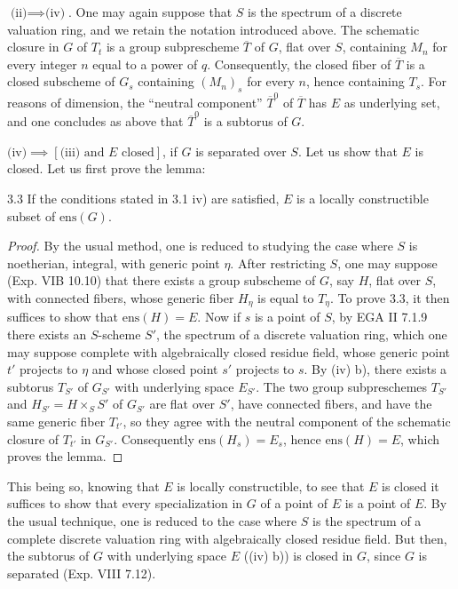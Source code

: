 $\text{(ii)}\implies\text{(iv)}$. One may again suppose that $S$ is the spectrum of a discrete valuation ring, and we retain the notation introduced above. The schematic closure in $G$ of $T_t$ is a group subprescheme $\overline T$ of $G$, flat over $S$, containing $M_n$ for every integer $n$ equal to a power of $q$. Consequently, the closed fiber of $\overline T$ is a closed subscheme of $G_s$ containing $(M_n)_s$ for every $n$, hence containing $T_s$. For reasons of dimension, the ``neutral component'' $\overline T^0$ of $\overline T$ has $E$ as underlying set, and one concludes as above that $\overline T^0$ is a subtorus of $G$.

$\text{(iv)}\implies[\text{(iii) and }E\text{ closed}]$, if $G$ is separated over $S$. Let us show that $E$ is closed. Let us first prove the lemma:
\begin{lemma}{3.3}\label{XV.3.3}
If the conditions stated in 3.1 iv) are satisfied, $E$ is a locally constructible subset of $\mathrm{ens}(G)$.
\end{lemma}
\begin{proof}
By the usual method, one is reduced to studying the case where $S$ is noetherian, integral, with generic point $\eta$. After restricting $S$, one may suppose (Exp. VIB 10.10) that there exists a group subscheme of $G$, say $H$, flat over $S$, with connected fibers, whose generic fiber $H_\eta$ is equal to $T_\eta$. To prove 3.3, it then suffices to show that $\mathrm{ens}(H)=E$. Now if $s$ is a point of $S$, by EGA II 7.1.9 there exists an $S$-scheme $S'$, the spectrum of a discrete valuation ring, which one may suppose complete with algebraically closed residue field, whose generic point $t'$ projects to $\eta$ and whose closed point $s'$ projects to $s$. By (iv) b), there exists a subtorus $T_{S'}$ of $G_{S'}$ with underlying space $E_{S'}$. The two group subpreschemes $T_{S'}$ and $H_{S'}=H\times_S S'$ of $G_{S'}$ are flat over $S'$, have connected fibers, and have the same generic fiber $T_{t'}$, so they agree with the neutral component of the schematic closure of $T_{t'}$ in $G_{S'}$. Consequently $\mathrm{ens}(H_s)=E_s$, hence $\mathrm{ens}(H)=E$, which proves the lemma.
\end{proof}

This being so, knowing that $E$ is locally constructible, to see that $E$ is closed it suffices to show that every specialization in $G$ of a point of $E$ is a point of $E$. By the usual technique, one is reduced to the case where $S$ is the spectrum of a complete discrete valuation ring with algebraically closed residue field. But then, the subtorus of $G$ with underlying space $E$ ((iv) b)) is closed in $G$, since $G$ is separated (Exp. VIII 7.12).
